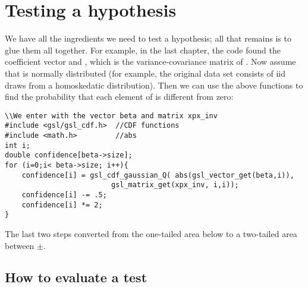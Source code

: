 \section{Testing a hypothesis}




We have all the ingredients we need to test a hypothesis; all that
remains is to glue them all together. For example, in the last chapter, the code
found the coefficient vector  and , which is the
variance-covariance matrix of .  Now assume that 
is normally distributed (for example, the original data set consists
of iid draws from a homoskedatic distribution). Then we can use the
above functions to find the probability that each element of 
is different from zero:

\begin{lstlisting}
\\We enter with the vector beta and matrix xpx_inv
#include <gsl/gsl_cdf.h>  //CDF functions
#include <math.h>         //abs
int i;
double confidence[beta->size];
for (i=0;i< beta->size; i++){
    confidence[i] = gsl_cdf_gaussian_Q( abs(gsl_vector_get(beta,i)), 
                         gsl_matrix_get(xpx_inv, i,i));
    confidence[i] -= .5;
    confidence[i] *= 2;
}
\end{lstlisting}
The last two steps converted from the one-tailed area below 
to a two-tailed area between $\pm$.



\subsection{How to evaluate a test}

